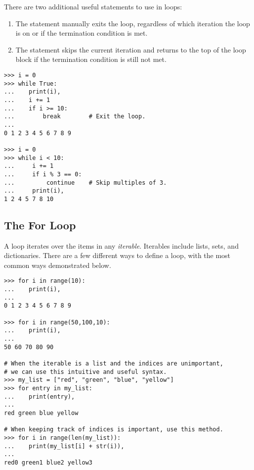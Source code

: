 \begin{comment}
\begin{info} %
In Python 2.7, executing \li{print(x)} prints out the string representation for the object \li{x} and a newline character (\li{\\n}).
Subsequent \li{print} statements will therefore display the object on a separate line.

In the above example, the comma in the line \li{print(i),} strips off the default endline character.
Subsequent calls then display the object on same line as previous call.
Try running this example with and without the comma.
\end{info}
\end{comment}

There are two additional useful statements to use in loops:
\begin{enumerate}
\item The  statement manually exits the loop, regardless of which iteration the loop is on or if the termination condition is met.
\item The  statement skips the current iteration and returns to the top of the loop block if the termination condition is still not met.
\end{enumerate}

\begin{lstlisting}
>>> i = 0
>>> while True:
...    print(i),
...    i += 1
...    if i >= 10:
...        break        # Exit the loop.
...
0 1 2 3 4 5 6 7 8 9

>>> i = 0
>>> while i < 10:
...     i += 1
...     if i % 3 == 0:
...         continue    # Skip multiples of 3.
...     print(i),
1 2 4 5 7 8 10

\end{lstlisting}

\subsection*{The For Loop}
A  loop iterates over the items in any \emph{iterable}.
Iterables include lists, sets, and dictionaries.
There are a few different ways to define a  loop, with the most common ways demonstrated below.

\begin{lstlisting}
>>> for i in range(10):
...    print(i),
...     
0 1 2 3 4 5 6 7 8 9

>>> for i in range(50,100,10):
...    print(i),
...
50 60 70 80 90

# When the iterable is a list and the indices are unimportant,
# we can use this intuitive and useful syntax.
>>> my_list = ["red", "green", "blue", "yellow"]
>>> for entry in my_list:
...    print(entry),
...
red green blue yellow

# When keeping track of indices is important, use this method.
>>> for i in range(len(my_list)):
...    print(my_list[i] + str(i)),
...
red0 green1 blue2 yellow3
\end{lstlisting}

